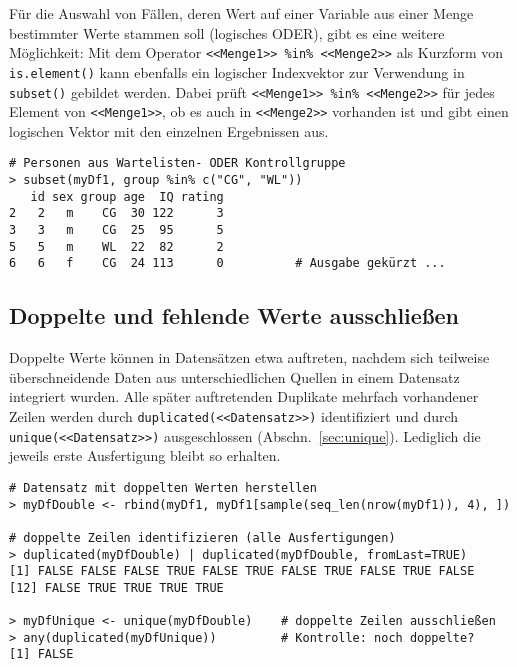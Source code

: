 Für die Auswahl von Fällen, deren Wert auf einer Variable aus einer Menge bestimmter Werte stammen soll (logisches ODER), gibt es eine weitere Möglichkeit: Mit dem Operator \lstinline!<<Menge1>> %in% <<Menge2>>! als Kurzform von \lstinline!is.element()! kann ebenfalls ein logischer Indexvektor zur Verwendung in \lstinline!subset()! gebildet werden. Dabei prüft \lstinline!<<Menge1>> %in% <<Menge2>>! für jedes Element von \lstinline!<<Menge1>>!, ob es auch in \lstinline!<<Menge2>>! vorhanden ist und gibt einen logischen Vektor mit den einzelnen Ergebnissen aus.
\begin{lstlisting}
# Personen aus Wartelisten- ODER Kontrollgruppe
> subset(myDf1, group %in% c("CG", "WL"))
   id sex group age  IQ rating
2   2   m    CG  30 122      3
3   3   m    CG  25  95      5
5   5   m    WL  22  82      2
6   6   f    CG  24 113      0          # Ausgabe gekürzt ...
\end{lstlisting}

\subsection{Doppelte und fehlende Werte ausschließen}
\label{sec:naDf}

Doppelte Werte können in Datensätzen etwa auftreten, nachdem sich teilweise überschneidende Daten aus unterschiedlichen Quellen in einem Datensatz integriert wurden. Alle später auftretenden Duplikate mehrfach vorhandener Zeilen werden durch \lstinline!duplicated(<<Datensatz>>)! identifiziert und durch \lstinline!unique(<<Datensatz>>)! ausgeschlossen (Abschn.\ \ref{sec:unique}). Lediglich die jeweils erste Ausfertigung bleibt so erhalten.
\begin{lstlisting}
# Datensatz mit doppelten Werten herstellen
> myDfDouble <- rbind(myDf1, myDf1[sample(seq_len(nrow(myDf1)), 4), ])

# doppelte Zeilen identifizieren (alle Ausfertigungen)
> duplicated(myDfDouble) | duplicated(myDfDouble, fromLast=TRUE)
[1] FALSE FALSE FALSE TRUE FALSE TRUE FALSE TRUE FALSE TRUE FALSE
[12] FALSE TRUE TRUE TRUE TRUE

> myDfUnique <- unique(myDfDouble)    # doppelte Zeilen ausschließen
> any(duplicated(myDfUnique))         # Kontrolle: noch doppelte?
[1] FALSE
\end{lstlisting}

